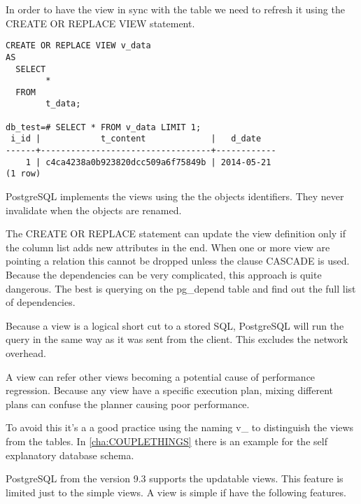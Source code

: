 In order to have the view in sync with the table we need to refresh it using the CREATE OR REPLACE
VIEW statement.

\begin{lstlisting}[style=pgsql]
 CREATE OR REPLACE VIEW v_data 
AS 
  SELECT 
        *
  FROM 
        t_data;
        
db_test=# SELECT * FROM v_data LIMIT 1;
 i_id |            t_content             |   d_date   
------+----------------------------------+------------
    1 | c4ca4238a0b923820dcc509a6f75849b | 2014-05-21
(1 row)

\end{lstlisting}

PostgreSQL implements the views using the the objects identifiers. They never invalidate when
the objects are renamed. \newline

The CREATE OR REPLACE statement can update the view definition only if the column 
list adds new attributes in the end. When one or more view are pointing a relation this cannot be
dropped unless the clause CASCADE is used. Because the dependencies can be very complicated, this
approach is quite dangerous. The best is querying on the pg\_depend table and find out the full
list of dependencies.\newline

Because a view is a logical short cut to a stored SQL, PostgreSQL will run the query in the same
way as it was sent from the client. This excludes the network overhead.

A view can refer other views becoming a potential cause of performance regression. Because any view
have a specific execution plan, mixing different plans can confuse the planner causing
poor performance.

To avoid this it's a a good practice using the naming  v\_ to distinguish the views from the
tables. In \ref{cha:COUPLETHINGS} there is an example for the self explanatory database schema.

PostgreSQL from the version 9.3 supports the updatable views. This feature is limited just to the
simple views. A view is simple  if have the following features.

